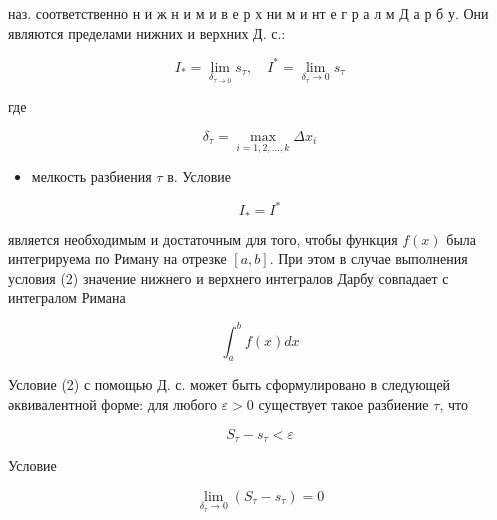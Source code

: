 \documentclass[10pt]{article}
\begin{document}
наз. соответственно н и ж н и м и в е р х ни м и нт е г р а л м Д а р б у. Они являются пределами нижних и верхних Д. с.:



\[

I_{*}=\lim _{\delta_{\tau \rightarrow 0}} s_{\tau}, \quad I^{*}=\lim _{\delta_{\tau} \rightarrow 0} s_{\tau}

\]



где



\[

\delta_{\tau}=\max _{i=1,2, \ldots, k} \Delta x_{i}

\]



\begin{itemize}

  \item мелкость разбиения $\tau$ в. Условие

\end{itemize}



\[

I_{*}=I^{*}

\]



является необходимым и достаточным для того, чтобы функция $f(x)$ была интегрируема по Риману на отрезке $[a, b]$. При этом в случае выполнения условия (2) значение нижнего и верхнего интегралов Дарбу совпадает с интегралом Римана



\[

\int_{a}^{b} f(x) d x

\]



Условие (2) с помощью Д. с. может быть сформулировано в следующей әквивалентной форме: для любого $\varepsilon>0$ существует такое разбиение $\tau$, что



\[

S_{\tau}-s_{\tau}<\varepsilon

\]



Условие



\[

\lim _{\delta_{\tau} \rightarrow 0}\left(S_{\tau}-s_{\tau}\right)=0

\]
\end{document}
